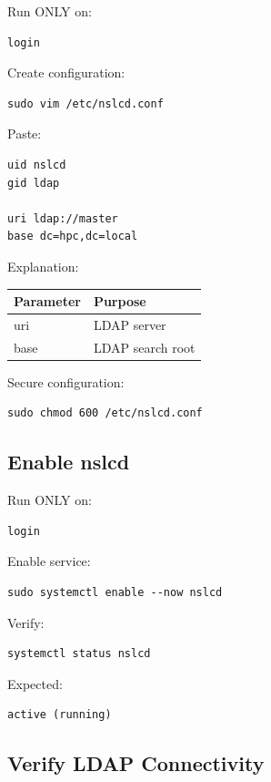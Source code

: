 \documentclass[11pt]{article}
\begin{document}
Run ONLY on:

\begin{verbatim}
login
\end{verbatim}

Create configuration:

\begin{verbatim}
sudo vim /etc/nslcd.conf
\end{verbatim}

Paste:

\begin{verbatim}
uid nslcd
gid ldap

uri ldap://master
base dc=hpc,dc=local
\end{verbatim}

Explanation:

\begin{center}
\begin{tabular}{ll}
Parameter & Purpose\\
\hline
uri & LDAP server\\
base & LDAP search root\\
\end{tabular}
\end{center}

Secure configuration:

\begin{verbatim}
sudo chmod 600 /etc/nslcd.conf
\end{verbatim}
\subsection{Enable nslcd}
\label{sec:orgc3b4508}

Run ONLY on:

\begin{verbatim}
login
\end{verbatim}

Enable service:

\begin{verbatim}
sudo systemctl enable --now nslcd
\end{verbatim}

Verify:

\begin{verbatim}
systemctl status nslcd
\end{verbatim}

Expected:

\begin{verbatim}
active (running)
\end{verbatim}
\subsection{Verify LDAP Connectivity}
\label{sec:org3d5fc06}
\end{document}
